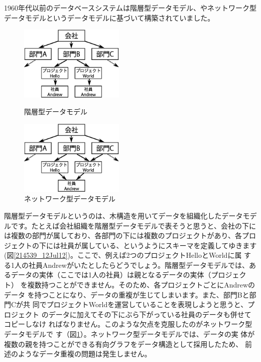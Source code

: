 1960年代以前のデータベースシステムは階層型データモデル、やネットワーク型
データモデルというデータモデルに基づいて構築されていました。

\begin{figure}[tb]
 \begin{minipage}{0.48\textwidth}
  \begin{center}
   \includegraphics[width=5cm]{hayamiz/images/hierarchical-data-model.eps}
   \caption{階層型データモデル}
   \label{214539_12Jul12}
  \end{center}
 \end{minipage}
 \begin{minipage}{0.48\textwidth}
  \begin{center}
   \includegraphics[width=5cm]{hayamiz/images/network-data-model.eps}
   \caption{ネットワーク型データモデル}
   \label{214707_12Jul12}
  \end{center}
 \end{minipage}
\end{figure}

階層型データモデルというのは、木構造を用いてデータを組織化したデータモデ
ルです。たとえば会社組織を階層型データモデルで表そうと思うと、会社の下に
は複数の部門が属しており、各部門の下には複数のプロジェクトがあり、各プロ
ジェクトの下には社員が属している、というようにスキーマを定義してゆきます
(図\ref{214539_12Jul12})。ここで、例えば2つのプロジェクトHelloとWorldに属
する1人の社員Andrewがいたとしたらどうでしょう。階層型データモデルでは、あ
るデータの実体（ここでは1人の社員）は親となるデータの実体（プロジェクト）
を複数持つことができません。そのため、各プロジェクトごとにAndrewのデータ
を持つことになり、データの重複が生じてしまいます。また、部門Bと部門Cが共
同でプロジェクトWorldを運営していることを表現しようと思うと、プロジェクト
のデータに加えてその下にぶら下がっている社員のデータも併せてコピーしなけ
ればなりません。このような欠点を克服したのがネットワーク型データモデルで
す（図\ref{214707_12Jul12}）。ネットワーク型データモデルでは、データの実
体が複数の親を持つことができる有向グラフをデータ構造として採用したため、
前述のようなデータ重複の問題は発生しません。


